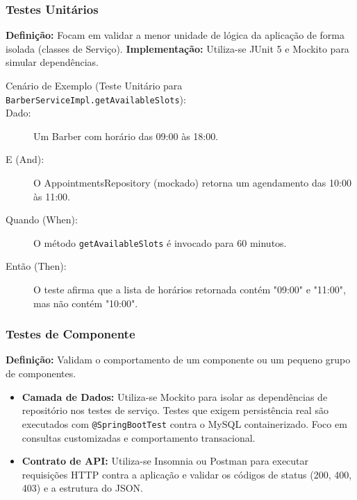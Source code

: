 \documentclass[
    12pt, 
    a4paper, 
    oneside, 
    chapter=TITLE, 
    section=TITLE
]{abntex2}
\begin{document}
\subsubsection{Testes Unitários}
\textbf{Definição:} Focam em validar a menor unidade de lógica da aplicação de forma isolada (classes de Serviço). \textbf{Implementação:} Utiliza-se JUnit 5 e Mockito para simular dependências.
\begin{description}
    \item[Cenário de Exemplo (Teste Unitário para \texttt{BarberServiceImpl.getAvailableSlots}):]
    \item[Dado:] Um Barber com horário das 09:00 às 18:00.
    \item[E (And):] O AppointmentsRepository (mockado) retorna um agendamento das 10:00 às 11:00.
    \item[Quando (When):] O método \texttt{getAvailableSlots} é invocado para 60 minutos.
    \item[Então (Then):] O teste afirma que a lista de horários retornada contém "09:00" e "11:00", mas não contém "10:00".
\end{description}

\subsubsection{Testes de Componente}
\textbf{Definição:} Validam o comportamento de um componente ou um pequeno grupo de componentes.
\begin{itemize}
    \item \textbf{Camada de Dados:} Utiliza-se Mockito para isolar as dependências de repositório nos testes de serviço. Testes que exigem persistência real são executados com \texttt{@SpringBootTest} contra o MySQL containerizado. Foco em consultas customizadas e comportamento transacional.
    \item \textbf{Contrato de API:} Utiliza-se Insomnia ou Postman para executar requisições HTTP contra a aplicação e validar os códigos de status (200, 400, 403) e a estrutura do JSON.
\end{itemize}
\end{document}
